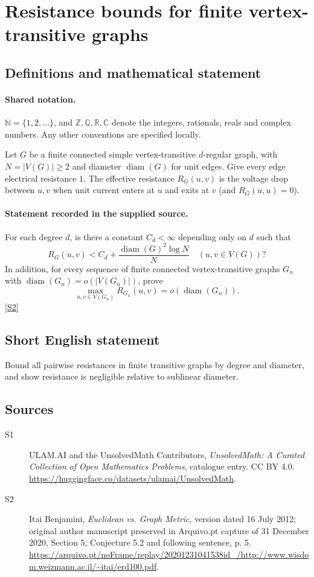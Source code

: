 \documentclass[11pt]{article}
\newcommand{\sref}[2]{\hyperlink{source:#1:#2}{[S#2]}}
\begin{document}
\section{Resistance bounds for finite vertex-transitive graphs}\label{statement}

\subsection{Definitions and mathematical statement}

\paragraph{Shared notation.}$\mathbb N=\{1,2,\ldots\}$, and $\mathbb Z,\mathbb Q,\mathbb R,\mathbb C$ denote the integers, rationals, reals and complex numbers. Any other conventions are specified locally.


Let $G$ be a finite connected simple vertex-transitive $d$-regular graph, with $N=|V(G)|\ge2$ and diameter $\operatorname{diam}(G)$ for unit edges. Give every edge electrical resistance $1$. The effective resistance $R_G(u,v)$ is the voltage drop between $u,v$ when unit current enters at $u$ and exits at $v$ (and $R_G(u,u)=0$).
\paragraph{Statement recorded in the supplied source.}
For each degree $d$, is there a constant $C_d<\infty$ depending only on $d$ such that
\[R_G(u,v)<C_d+\frac{\operatorname{diam}(G)^2\log N}{N}\quad(u,v\in V(G))?\]
In addition, for every sequence of finite connected vertex-transitive graphs $G_n$ with $\operatorname{diam}(G_n)=o(|V(G_n)|)$, prove
\[\max_{u,v\in V(G_n)}R_{G_n}(u,v)=o(\operatorname{diam}(G_n)).\] \sref{statement}{2}
\subsection{Short English statement}
Bound all pairwise resistances in finite transitive graphs by degree and diameter, and show resistance is negligible relative to sublinear diameter.
\subsection{Sources}
\begin{description}
\item[\hypertarget{source:statement:1}{S1}] ULAM.AI and the UnsolvedMath Contributors, \emph{UnsolvedMath: A Curated Collection of Open Mathematics Problems}, catalogue entry. CC BY 4.0. \url{https://huggingface.co/datasets/ulamai/UnsolvedMath}.
\item[\hypertarget{source:statement:2}{S2}] Itai Benjamini, \emph{Euclidean vs. Graph Metric}, version dated 16 July 2012; original author manuscript preserved in Arquivo.pt capture of 31 December 2020, Section 5, Conjecture 5.2 and following sentence, p. 5. \url{https://arquivo.pt/noFrame/replay/20201231041538id_/http://www.wisdom.weizmann.ac.il/~itai/erd100.pdf}.
\end{description}
\label{end:statement}
\end{document}
